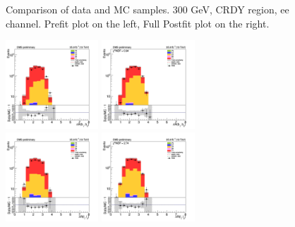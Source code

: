 \begin{figure}[tbp]
\begin{center}
    \caption{Comparison of data and MC samples. 300 GeV, CRDY region, ee channel. Prefit plot on the left,           Full Postfit plot on the right.}
    \label{fig:MCcomparisons_ee_low_CRDY_2}
  \end{center}
\end{figure}



\begin{figure}[tbp]
  \begin{center}
    \includegraphics[width=0.31\textwidth]{figures/ee_300_april18/ee_300_good_SR_bdt_sideBand_april18/dR_bjets_ee_SR_prefit_plot_apr18.png}
    \includegraphics[width=0.31\textwidth]{figures/ee_300_april18/ee_300_good_SR_bdt_sideBand_april18/dR_bjets_ee_SR_FullPostfit_plot_apr18.png}\\
    \includegraphics[width=0.31\textwidth]{figures/ee_300_april18/ee_300_good_SR_bdt_sideBand_april18/dR_leps_ee_SR_prefit_plot_apr18.png}
    \includegraphics[width=0.31\textwidth]{figures/ee_300_april18/ee_300_good_SR_bdt_sideBand_april18/dR_leps_ee_SR_FullPostfit_plot_apr18.png}\\

\end{center}
\end{figure}
